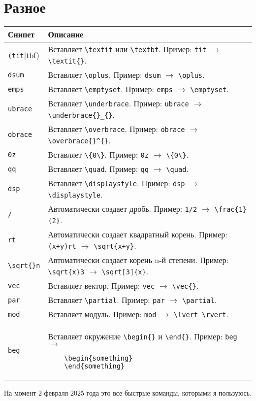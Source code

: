 \documentclass[a4paper]{article}
\begin{document}
\section{Разное}
\begin{longtable}{|p{3cm}|p{10cm}|}
    \hline
    \textbf{Снипет} & \textbf{Описание} \\
    \hline
    \verb|(tit||tbf) & Вставляет \verb|\textit| или \verb|\textbf|. Пример: \verb|tit| $\rightarrow$ \verb|\textit{}|. \\
    \hline
    \verb|dsum| & Вставляет \verb|\oplus|. Пример: \verb|dsum| $\rightarrow$ \verb|\oplus|. \\
    \hline
    \verb|emps| & Вставляет \verb|\emptyset|. Пример: \verb|emps| $\rightarrow$ \verb|\emptyset|. \\
    \hline
    \verb|ubrace| & Вставляет \verb|\underbrace|. Пример: \verb|ubrace| $\rightarrow$ \verb|\underbrace{}_{}|. \\
    \hline
    \verb|obrace| & Вставляет \verb|\overbrace|. Пример: \verb|obrace| $\rightarrow$ \verb|\overbrace{}^{}|. \\
    \hline
    \verb|0z| & Вставляет \verb|\{0\}|. Пример: \verb|0z| $\rightarrow$ \verb|\{0\}|. \\
    \hline
    \verb|qq| & Вставляет \verb|\quad|. Пример: \verb|qq| $\rightarrow$ \verb|\quad|. \\
    \hline
    \verb|dsp| & Вставляет \verb|\displaystyle|. Пример: \verb|dsp| $\rightarrow$ \verb|\displaystyle|. \\
    \hline
    \verb|/| & Автоматически создает дробь. Пример: \verb|1/2| $\rightarrow$ \verb|\frac{1}{2}|. \\
    \hline
    \verb|rt| & Автоматически создает квадратный корень. Пример: \verb|(x+y)rt| $\rightarrow$ \verb|\sqrt{x+y}|. \\
    \hline
    \verb|\sqrt{}n| & Автоматически создает корень n-й степени. Пример: \verb|\sqrt{x}3| $\rightarrow$ \verb|\sqrt[3]{x}|. \\
    \hline
    \verb|vec| & Вставляет вектор. Пример: \verb|vec| $\rightarrow$ \verb|\vec{}|. \\
    \hline
    \verb|par| & Вставляет \verb|\partial|. Пример: \verb|par| $\rightarrow$ \verb|\partial|. \\
    \hline
    \verb|mod| & Вставляет модуль. Пример: \verb|mod| $\rightarrow$ \verb|\lvert \rvert|. \\
    \hline
    \verb|beg| & Вставляет окружение \verb|\begin{}| и \verb|\end{}|. Пример: \verb|beg| $\rightarrow$ 
    \begin{verbatim}
    \begin{something}
    \end{something}
    \end{verbatim} \\
    \hline
\end{longtable}

\begin{center}
    На момент 2 февраля 2025 года это все быстрые команды, которыми я пользуюсь.
\end{center}
\end{document}
